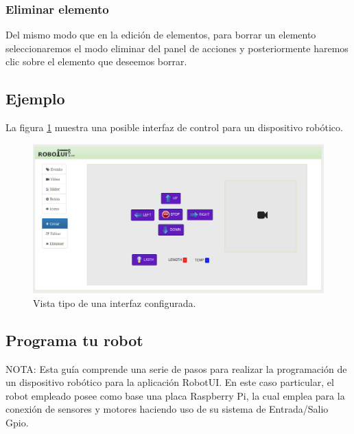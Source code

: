 \subsubsection{Eliminar elemento}

Del mismo modo que en la edición de elementos, para borrar un elemento seleccionaremos el modo eliminar   del panel de acciones y posteriormente haremos clic sobre el elemento que deseemos borrar.\\


\subsection{Ejemplo}

La figura \ref{website:interfaz-configurada} muestra una posible interfaz de control para un dispositivo robótico.

\begin{figure}[H]
  \begin{center}
    \includegraphics[scale=.4]{imagenes/manual-usuario/interfaz-creada.png}
  \end{center}
  \caption{Vista tipo de una interfaz configurada.}
  \label{website:interfaz-configurada}
\end{figure}



\subsection{ Programa tu robot }
\label{sec:programacion-robot}

NOTA: Esta guía comprende una serie de pasos para realizar la programación de un dispositivo robótico para la aplicación RobotUI. En este caso particular, el robot empleado posee como base una placa 
Raspberry Pi, la cual emplea para la conexión de sensores y motores haciendo uso de su sistema de Entrada/Salio Gpio.\\

